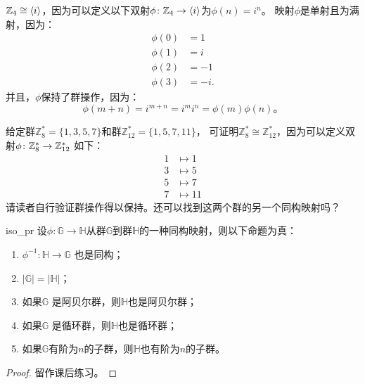 \begin{example}
${\mathbb Z}_4\cong \langle i \rangle$，因为可以定义以下双射$\phi\colon {\mathbb Z}_4 \to \langle i \rangle$为$\phi(n) = i^n$。
映射$\phi$是单射且为满射，因为：
\begin{align*}
\phi(0) &= 1\\
 \phi(1) &= i\\
 \phi(2) &= -1\\
 \phi(3) &= -i.
\end{align*}
并且，$\phi$保持了群操作，因为：
\[ \phi(m+n) = i^{m+n} = i^m i^n = \phi(m) \phi(n)\text{。}\]
\end{example}

\begin{example}
	给定群$\mathbb{Z}_8^* = \{1, 3, 5, 7 \}$和群$\mathbb{Z}_{12}^* = \{1, 5, 7, 11 \}$，
	可证明$\mathbb{Z}_8^* \cong \mathbb{Z}_{12}^* $，因为可以定义双射$\phi\colon {\mathbb Z}_8^*  \to {\mathbb Z}_{12}^*$ 如下：
		\begin{align*}
		1 &\mapsto 1 \\
		3 &\mapsto 5 \\
		5 &\mapsto 7\\
		7 &\mapsto 11
		\end{align*}
请读者自行验证群操作得以保持。还可以找到这两个群的另一个同构映射吗？
	\end{example}

\begin{proposition}{}{iso_pr}
设$\phi\colon \mathbb{G} \to \mathbb{H}$从群$\mathbb{G}$到群$\mathbb{H}$的一种同构映射，则以下命题为真：
\begin{enumerate}
\item $\phi^{-1}\colon \mathbb{H} \to \mathbb{G}$ 也是同构；

\item $\vert \mathbb{G} \vert = \vert \mathbb{H} \vert $；

\item 如果$\mathbb{G}$ 是阿贝尔群，则$\mathbb{H}$也是阿贝尔群；

\item 如果$\mathbb{G}$ 是循环群，则$\mathbb{H}$也是循环群；

\item 如果$\mathbb{G}$有阶为$n$的子群，则$\mathbb{H}$也有阶为$n$的子群。
\end{enumerate}
\end{proposition}

\begin{proof}
留作课后练习。
\end{proof}


